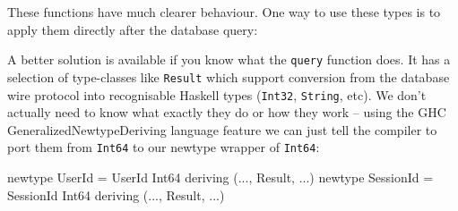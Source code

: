 \documentclass{tmr}
\begin{document}
These functions have much clearer behaviour.
%
%
%
%
%
%
%
 One way to use these types is to apply them directly after the database query:


A better solution is available if you know what the \lstinline|query| function does.  It has a selection of type-classes like \lstinline|Result| which support conversion from the database wire protocol into recognisable Haskell types (\lstinline|Int32|, \lstinline|String|, etc).  We don't actually need to know what exactly they do or how they work -- using the GHC GeneralizedNewtypeDeriving language feature we can just tell the compiler to port them from \lstinline|Int64| to our newtype wrapper of \lstinline|Int64|:

\begin{code}
newtype UserId = UserId Int64 deriving (..., Result, ...)
newtype SessionId = SessionId Int64 deriving (..., Result, ...)
\end{code}
\end{document}

